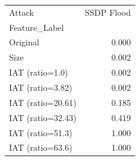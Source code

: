 \begin{tabular}{lr}
\toprule
Attack & SSDP Flood \\
Feature_Label &  \\
\midrule
Original & 0.000 \\
Size & 0.002 \\
IAT (ratio=1.0) & 0.002 \\
IAT (ratio=3.82) & 0.002 \\
IAT (ratio=20.61) & 0.185 \\
IAT (ratio=32.43) & 0.419 \\
IAT (ratio=51.3) & 1.000 \\
IAT (ratio=63.6) & 1.000 \\
\bottomrule
\end{tabular}
